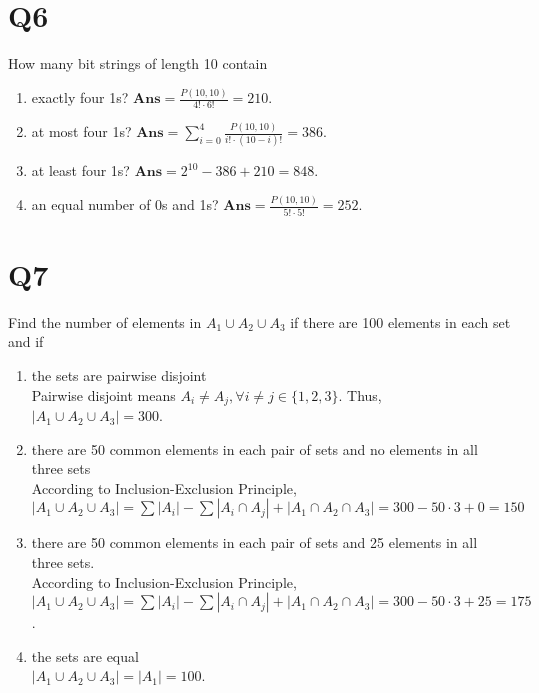 \documentclass[11pt]{article}
\newenvironment{qparts}{\begin{enumerate}[{(}a{)}]}{\end{enumerate}}
\begin{document}
\section*{Q6}
How many bit strings of length 10 contain
\begin{qparts}
    
    \item exactly four 1s?
    $\textbf{Ans}=\frac{P(10, 10)}{4!\cdot 6!}=210$.

    \item at most four 1s?
    $\textbf{Ans}=\sum_{i=0}^4 \frac{P(10 , 10)}{i! \cdot (10-i)!}=386$.

    \item at least four 1s?
    $\textbf{Ans}=2^{10}-386+210=848$.

    \item an equal number of 0s and 1s?
    $\textbf{Ans}=\frac{P(10, 10)}{5!\cdot 5!}=252$.
\end{qparts}

\section*{Q7}
Find the number of elements in $A_1 \cup  A_2 \cup  A_3$ if there are 100
elements in each set and if
\begin{qparts}
    
    \item the sets are pairwise disjoint\\
    Pairwise disjoint means $A_i\neq A_j, \forall i\neq j \in \{ 1,2,3 \}$. Thus, $\left\vert A_1 \cup A_2 \cup A_3 \right\vert =300$.

    \item there are 50 common elements in each pair of sets and no elements in all three sets\\
    According to Inclusion-Exclusion Principle, \\$
    \left\vert A_1 \cup A_2 \cup A_3 \right\vert=
    \sum\left\vert A_{i } \right\vert-\sum\left\vert A_{i} \cap A_{j } \right\vert+\left\vert A_1 \cap A_2 \cap A_3 \right\vert=300-50\cdot 3+0=150$

    \item there are 50 common elements in each pair of sets and 25 elements in all three sets.\\
    According to Inclusion-Exclusion Principle, \\$
    \left\vert A_1 \cup A_2 \cup A_3 \right\vert=
    \sum\left\vert A_{i } \right\vert-\sum\left\vert A_{i} \cap A_{j } \right\vert+\left\vert A_1 \cap A_2 \cap A_3 \right\vert=300-50\cdot 3+25=175$.

    \item the sets are equal\\
    $\left\vert A_1 \cup A_2 \cup A_3 \right\vert=\left\vert A_1 \right\vert=100  $.
\end{qparts}
\end{document}
